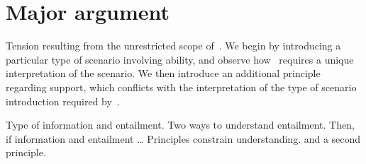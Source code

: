 \section{Major argument}
\label{sec:broad-argum-overv}

\begin{note}[Overview]
  Tension resulting from the unrestricted scope of~\ESU{}.
  We begin by introducing a particular type of scenario involving ability, and observe how~\ESU{} requires a unique interpretation of the scenario.
  We then introduce an additional principle regarding support, which conflicts with the interpretation of the type of scenario introduction required by~\ESU{}.
\end{note}

\begin{note}
  Type of information and entailment.
  Two ways to understand entailment.
  Then, if information and entailment \dots
  Principles constrain understanding.
  \ESU{} and a second principle.
\end{note}



